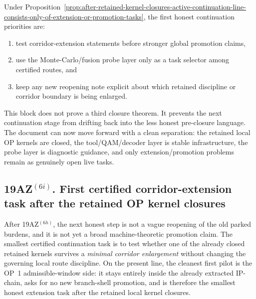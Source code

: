 \begin{corollary}
\label{cor:first-normalized-continuation-priorities-after-retained-op-kernel-closures}
Under Proposition~\ref{prop:after-retained-kernel-closures-active-continuation-line-consists-only-of-extension-or-promotion-tasks}, the first honest continuation priorities are:
\begin{enumerate}[leftmargin=2em,label=(\alph*)]
  \item test corridor-extension statements before stronger global promotion claims,
  \item use the Monte-Carlo/fusion probe layer only as a task selector among certified routes, and
  \item keep any new reopening note explicit about which retained discipline or corridor boundary is being enlarged.
\end{enumerate}
\end{corollary}

\begin{remark}
\label{rem:what-joint-post-closure-synthesis-buys}
This block does not prove a third closure theorem. It prevents the next continuation stage from drifting back into the less honest pre-closure language. The document can now move forward with a clean separation: the retained local OP kernels are closed, the tool/QAM/decoder layer is stable infrastructure, the probe layer is diagnostic guidance, and only extension/promotion problems remain as genuinely open live tasks.
\end{remark}


\subsection*{19AZ$^{(6i)}$. First certified corridor-extension task after the retained OP kernel closures}
\label{sec:first-certified-corridor-extension-task-after-retained-op-kernel-closures}
After 19AZ$^{(6h)}$, the next honest step is not a vague reopening of the old parked burdens, and it is not yet a broad machine-theoretic promotion claim. The smallest certified continuation task is to test whether one of the already closed retained kernels survives a \emph{minimal corridor enlargement} without changing the governing local route discipline. On the present line, the cleanest first pilot is the OP~1 admissible-window side: it stays entirely inside the already extracted IP-chain, asks for no new branch-shell promotion, and is therefore the smallest honest extension task after the retained local kernel closures.

